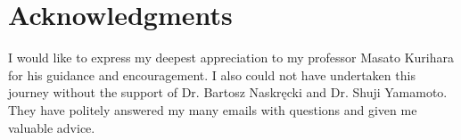 \documentclass[main]{subfiles}
\begin{document}
{}
\section*{Acknowledgments}
I would like to express my deepest appreciation to my professor Masato Kurihara for his guidance and encouragement.
I also could not have undertaken this journey without the support of Dr. Bartosz Naskręcki and Dr. Shuji Yamamoto.
They have politely answered my many emails with questions and given me valuable advice.
\end{document}
